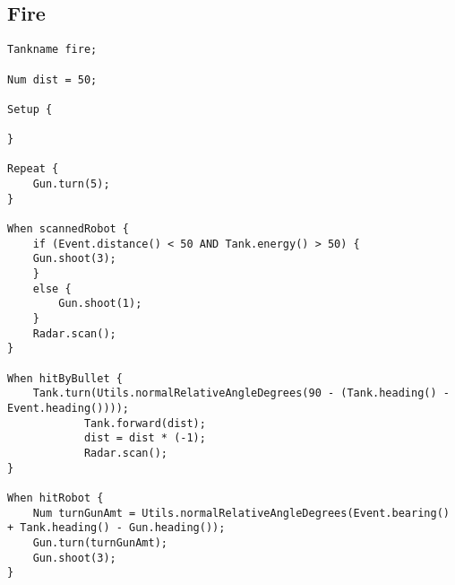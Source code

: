\subsection{Fire}
\begin{lstlisting}[caption={The robot Fire written in our language.}, label={lst:Fire}]
	Tankname fire;

Num dist = 50;

Setup {

}

Repeat {
    Gun.turn(5);
}

When scannedRobot {
    if (Event.distance() < 50 AND Tank.energy() > 50) {
    Gun.shoot(3);
    }
    else {
        Gun.shoot(1);
    }
    Radar.scan();
}

When hitByBullet {
    Tank.turn(Utils.normalRelativeAngleDegrees(90 - (Tank.heading() - Event.heading())));
    		Tank.forward(dist);
    		dist = dist * (-1);
    		Radar.scan();
}

When hitRobot {
    Num turnGunAmt = Utils.normalRelativeAngleDegrees(Event.bearing() + Tank.heading() - Gun.heading());
    Gun.turn(turnGunAmt);
    Gun.shoot(3);
}
\end{lstlisting}

